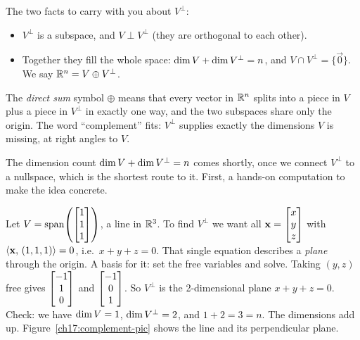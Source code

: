 \begin{focusbox}
The two facts to carry with you about $V^\perp$:
\begin{itemize}
  \item $V^\perp$ is a subspace, and $V\perp V^\perp$ (they are orthogonal to each other).
  \item Together they fill the whole space: $\operatorname{dim} V + \operatorname{dim} V^\perp = n$, and
        $V\cap V^\perp=\{\vec0\}$. We say $\mathbb{R}^n = V \oplus V^\perp$.
\end{itemize}
The \emph{direct sum} symbol $\oplus$ means that every vector in $\mathbb{R}^n$ splits into a piece in
$V$ plus a piece in $V^\perp$ in exactly one way, and the two subspaces share only the origin.
The word ``complement'' fits: $V^\perp$ supplies exactly the dimensions $V$ is missing, at right
angles to $V$.
\end{focusbox}

The dimension count $\operatorname{dim} V + \operatorname{dim} V^\perp = n$ comes shortly, once we connect $V^\perp$
to a nullspace, which is the shortest route to it. First, a hands-on computation to make the
idea concrete.

\begin{labbox}
Let $V=\operatorname{span}\!\left(\begin{bmatrix}1\\1\\1\end{bmatrix}\right)$, a line in $\mathbb{R}^3$. To find $V^\perp$ we want all
$\mathbf{x}=\begin{bmatrix}x\\y\\z\end{bmatrix}$ with $\langle \mathbf{x},\, (1,1,1) \rangle=0$, i.e.\ $x+y+z=0$. That single equation
describes a \emph{plane} through the origin. A basis for it: set the free variables and solve.
Taking $(y,z)$ free gives $\begin{bmatrix}-1\\1\\0\end{bmatrix}$ and $\begin{bmatrix}-1\\0\\1\end{bmatrix}$. So $V^\perp$ is the
2-dimensional plane $x+y+z=0$. Check: we have $\operatorname{dim} V=1$, $\operatorname{dim} V^\perp=2$, and
$1+2=3=n$. The dimensions add up. Figure~\ref{ch17:complement-pic} shows the line and its
perpendicular plane.
\end{labbox}


